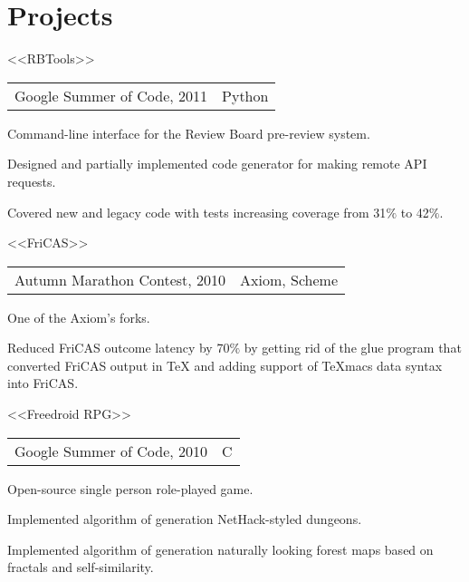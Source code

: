 \documentclass[a4paper]{article}
\begin{document}

	\section{Projects}
	\begin{multicols}{2}
		\raggedcolumns
		\begin{project}{<<RBTools>>}{\begin{tabular}{@{}l|l}Google Summer of Code, 2011 & Python\\\end{tabular}}
			Command-line interface for the Review Board pre-review system.
			\begin{items}
				\item Designed and partially implemented code generator for making remote API requests.
				\item Covered new and legacy code with tests increasing coverage from 31$\%$ to 42$\%$.
			\end{items}
		\end{project}

		\begin{project}{<<FriCAS>>}{\begin{tabular}{@{}l|l}Autumn Marathon Contest, 2010 & Axiom, Scheme\\\end{tabular}}
			One of the Axiom's forks.
			\begin{items}
				\item Reduced FriCAS outcome latency by 70$\%$ by getting rid of the glue program that converted FriCAS output in \TeX{} and adding support of TeXmacs data syntax into FriCAS.
			\end{items}
		\end{project}

		\columnbreak

		\begin{project}{<<Freedroid RPG>>}{\begin{tabular}{@{}l|l}Google Summer of Code, 2010 & C\\\end{tabular}}
			Open-source single person role-played game.
			\begin{items}
				\item Implemented algorithm of generation NetHack-styled dungeons.
				\item Implemented algorithm of generation naturally looking forest maps based on fractals and self-similarity.
			\end{items}
		\end{project}


\end{multicols}
\end{document}
